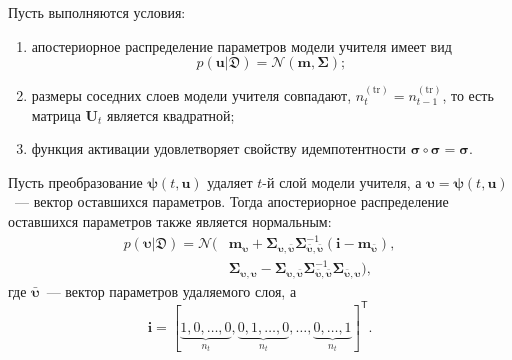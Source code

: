 \begin{theorem}\label{theorem:bayes-distill-layer}
Пусть выполняются условия:
\begin{enumerate}[1)]
    \item апостериорное распределение параметров модели учителя имеет вид
    \[
        p(\mathbf{u}|\mathfrak{D})=\mathcal{N}(\mathbf{m},\boldsymbol{\Sigma});
    \]
    \item размеры соседних слоев модели учителя совпадают, $n_t^{(\mathrm{tr})}=n_{t-1}^{(\mathrm{tr})}$, то есть матрица $\mathbf{U}_t$ является квадратной;
    \item функция активации удовлетворяет свойству идемпотентности $\boldsymbol{\sigma}\circ\boldsymbol{\sigma}=\boldsymbol{\sigma}$.
\end{enumerate}
Пусть преобразование $\boldsymbol{\psi}(t,\mathbf{u})$ удаляет $t$-й слой модели учителя, а $\boldsymbol{\upsilon}=\boldsymbol{\psi}(t,\mathbf{u})$~--- вектор оставшихся параметров. Тогда апостериорное распределение оставшихся параметров также является нормальным:
\[
\begin{aligned}
    p(\boldsymbol{\upsilon}|\mathfrak{D})
    =
    \mathcal{N}\bigl(
    &\mathbf{m}_{\boldsymbol{\upsilon}}
    +
    \boldsymbol{\Sigma}_{\boldsymbol{\upsilon},\bar{\boldsymbol{\upsilon}}}
    \boldsymbol{\Sigma}_{\bar{\boldsymbol{\upsilon}},\bar{\boldsymbol{\upsilon}}}^{-1}
    (\mathbf{i}-\mathbf{m}_{\bar{\boldsymbol{\upsilon}}}),\\
    &\boldsymbol{\Sigma}_{\boldsymbol{\upsilon},\boldsymbol{\upsilon}}
    -
    \boldsymbol{\Sigma}_{\boldsymbol{\upsilon},\bar{\boldsymbol{\upsilon}}}
    \boldsymbol{\Sigma}_{\bar{\boldsymbol{\upsilon}},\bar{\boldsymbol{\upsilon}}}^{-1}
    \boldsymbol{\Sigma}_{\bar{\boldsymbol{\upsilon}},\boldsymbol{\upsilon}}
    \bigr),
\end{aligned}
\]
где $\bar{\boldsymbol{\upsilon}}$~--- вектор параметров удаляемого слоя, а
\[
    \mathbf{i}=
    [\underbrace{1,0,\ldots,0}_{n_t},
    \underbrace{0,1,\ldots,0}_{n_t},
    \ldots,
    \underbrace{0,\ldots,1}_{n_t}]^{\mathsf{T}}.
\]
\end{theorem}
